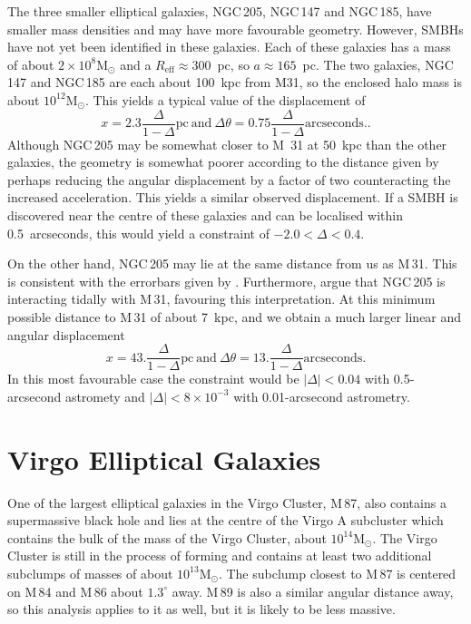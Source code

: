\documentclass[useAMS,usenatbib]{mn2e}
\newcommand{\msun}{\mathrm{M}_\odot}
\begin{document}
The three smaller elliptical galaxies, NGC\,205, NGC\,147 and NGC\,185,
have smaller mass densities and may have more favourable geometry.  However,
SMBHs have not yet been identified in these galaxies.  Each of these
galaxies has a mass of about $2 \times 10^8 \msun$ and a
$R_\mathrm{eff} \approx 300$~pc, so $a \approx 165$~pc.  The two
galaxies, NGC\,147 and NGC\,185 are each about 100~kpc from M31, so the
enclosed halo mass is about $10^{12} \msun$.  This yields a
typical value of the displacement of
\begin{equation}
  x = 2.3 \frac{\Delta}{1-\Delta} \mathrm{pc} ~\mathrm{and}~
  \Delta \theta = 0.75 \frac{\Delta}{1-\Delta} \mathrm{arcseconds}.
  \label{eq:12}.
\end{equation}
Although NGC\,205 may be somewhat closer to M~31 at 50~kpc than the
other galaxies, the geometry is somewhat poorer according to the
distance given by \citet{2006AJ....131.1405K} perhaps reducing the
angular displacement by a factor of two counteracting the increased
acceleration.  This yields a similar observed displacement.  If a SMBH
is discovered near the centre of these galaxies and can be localised
within 0.5~arcseconds, this would yield a constraint of $-2.0 < \Delta
< 0.4$.

On the other hand, NGC\,205 may lie at the same distance from
us as M\,31. This is consistent with the errorbars given by
\citet{2006AJ....131.1405K}.  Furthermore, \citet{2006AJ....131..332G}
argue that NGC\,205 is interacting tidally with M\,31, favouring this
interpretation.  At this minimum possible distance to M\,31 of about
7~kpc, and we obtain a much larger linear and angular displacement
\begin{equation}
  x = 43. \frac{\Delta}{1-\Delta} \mathrm{pc} ~\mathrm{and}~
  \Delta \theta = 13. \frac{\Delta}{1-\Delta} \mathrm{arcseconds}.
\end{equation}
In this most favourable case the constraint would be $|\Delta| < 0.04$
with 0.5-arcsecond astromety and $|\Delta|<8\times 10^{-3}$ with
0.01-arcsecond astrometry.

\section{Virgo Elliptical Galaxies}

One of the largest elliptical galaxies in the Virgo Cluster, M\,87,
also contains a supermassive black hole and lies at the centre of the
Virgo A subcluster which contains the bulk of the mass of the Virgo
Cluster, about $10^{14} \msun$.  The Virgo Cluster is still in the
process of forming and contains at least two additional subclumps of
masses of about $10^{13} \msun$.  The subclump closest to M\,87 is
centered on M\,84 and M\,86 about $1.3^\circ$ away.  M\,89 is also a
similar angular distance away, so this analysis applies to it as well,
but it is likely to be less massive.
\end{document}
